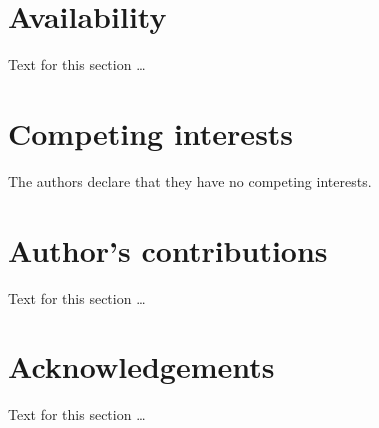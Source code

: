 \documentclass[twocolumn]{bmcart}
\begin{document}
\section*{Availability}
Text for this section \ldots


\begin{backmatter}

\section*{Competing interests}
  The authors declare that they have no competing interests.

\section*{Author's contributions}
    Text for this section \ldots

\section*{Acknowledgements}
  Text for this section \ldots



\end{backmatter}
\end{document}
